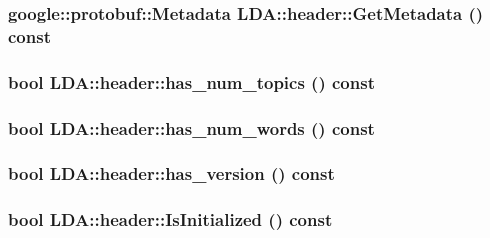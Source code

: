 \label{class_l_d_a_1_1header_a94543e30afd06f46e7d4a1d878630dda}
\hypertarget{class_l_d_a_1_1header_a6b19f3da9919a2fae6c1e19da47a0ff1}{
\subsubsection[{GetMetadata}]{\setlength{\rightskip}{0pt plus 5cm}google::protobuf::Metadata LDA::header::GetMetadata () const}}
\label{class_l_d_a_1_1header_a6b19f3da9919a2fae6c1e19da47a0ff1}
\hypertarget{class_l_d_a_1_1header_a6503c56af69b39da3f325c58d062417a}{
\subsubsection[{has\_\-num\_\-topics}]{\setlength{\rightskip}{0pt plus 5cm}bool LDA::header::has\_\-num\_\-topics () const}}
\label{class_l_d_a_1_1header_a6503c56af69b39da3f325c58d062417a}
\hypertarget{class_l_d_a_1_1header_a4e5efbf319ae3c0b9dca161a90655d14}{
\subsubsection[{has\_\-num\_\-words}]{\setlength{\rightskip}{0pt plus 5cm}bool LDA::header::has\_\-num\_\-words () const}}
\label{class_l_d_a_1_1header_a4e5efbf319ae3c0b9dca161a90655d14}
\hypertarget{class_l_d_a_1_1header_a0df1796a2011f0edab9bbf5235389c9d}{
\subsubsection[{has\_\-version}]{\setlength{\rightskip}{0pt plus 5cm}bool LDA::header::has\_\-version () const}}
\label{class_l_d_a_1_1header_a0df1796a2011f0edab9bbf5235389c9d}
\hypertarget{class_l_d_a_1_1header_aa5306ee3c56f17f9acc062d15a80ddbb}{
\subsubsection[{IsInitialized}]{\setlength{\rightskip}{0pt plus 5cm}bool LDA::header::IsInitialized () const}}
